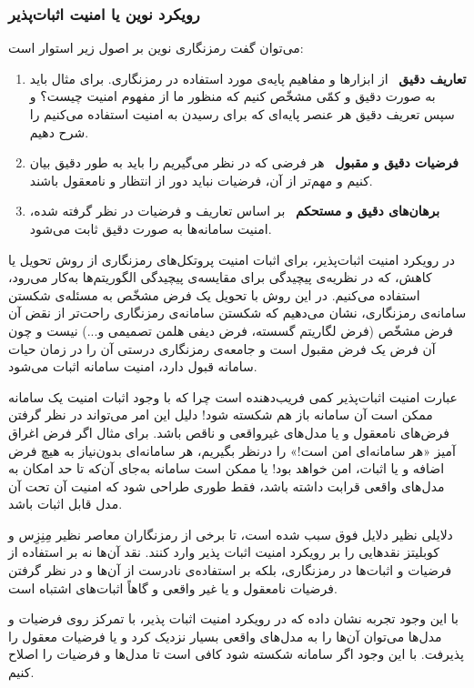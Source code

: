 \subsubsection*{رویکرد نوین یا امنیت اثبات‌پذیر}
می‌توان گفت رمزنگاری نوین بر اصول زیر استوار است:
\begin{enumerate}
	\item
	\textbf{تعاریف دقیق} 
	\ از ابزارها و مفاهیم پایه‌ی مورد استفاده در رمزنگاری. برای مثال باید به صورت دقیق و کمّی مشخّص کنیم که منظور ما از مفهوم امنیت چیست؟ و سپس تعریف دقیق هر عنصر پایه‌ای که برای رسیدن به امنیت استفاده می‌کنیم را شرح دهیم.
	\item
	\textbf{فرضیات دقیق و مقبول}
	\  هر فرضی که در نظر می‌گیریم را باید به طور دقیق بیان کنیم و مهم‌تر از آن،  فرضیات نباید دور از انتظار و نامعقول باشند. 
	 \item
	\textbf{ برهان‌های دقیق و مستحکم}
	\ بر اساس تعاریف و فرضیات در نظر گرفته شده، امنیت سامانه‌ها به صورت دقیق ثابت می‌شود. 
\end{enumerate}


در رویکرد امنیت اثبات‌پذیر، برای اثبات امنیت پروتکل‌های رمزنگاری از روش تحویل یا کاهش،
که در نظریه‌ی پیچیدگی  برای مقایسه‌ی پیچیدگی الگوریتم‌ها به‌کار می‌رود، استفاده می‌کنیم. در این روش با تحویل یک فرض مشخّص به مسئله‌ی شکستن سامانه‌ی رمزنگاری، نشان می‌دهیم که شکستن سامانه‌ی رمزنگاری راحت‌تر از نقض آن فرض مشخّص (فرض لگاریتم گسسته، فرض دیفی هلمن تصمیمی و...) نیست و چون آن فرض یک فرض مقبول است و جامعه‌ی رمزنگاری درستی آن را در زمان حیات سامانه قبول دارد، امنیت سامانه اثبات می‌شود.


عبارت 
امنیت اثبات‌پذیر 
کمی فریب‌دهنده است چرا که با وجود اثبات امنیت یک سامانه ممکن است آن سامانه باز هم شکسته شود! دلیل این امر می‌تواند در نظر گرفتن فرض‌های نامعقول و یا مدل‌های غیرواقعی و ناقص باشد. برای مثال اگر فرض اغراق آمیز 
«هر سامانه‌ای امن است!»
 را درنظر بگیریم، هر سامانه‌ای بدون‌نیاز به هیچ فرض اضافه و یا اثبات، امن خواهد بود! یا ممکن است سامانه به‌جای آن‌که تا حد امکان به مدل‌های واقعی قرابت داشته باشد، فقط طوری طراحی  شود که امنیت آن تحت آن مدل قابل اثبات باشد.
 
 
 دلایلی نظیر دلایل فوق سبب شده است، تا برخی از رمزنگاران معاصر
 نظیر مِنِزِس
 و
 کوبلیتز
 نقدهایی را بر رویکرد امنیت اثبات پذیر وارد کنند.
   نقد آن‌ها نه بر استفاده از فرضیات و اثبات‌ها در رمزنگاری، بلکه بر استفاده‌ی نادرست از آن‌ها و در نظر گرفتن فرضیات نامعقول و یا غیر واقعی و گاهاً اثبات‌های اشتباه است. 
   
   با این وجود تجربه نشان داده که در رویکرد امنیت اثبات پذیر، با تمرکز روی فرضیات و مدل‌ها می‌توان آن‌ها را به مدل‌های واقعی بسیار نزدیک کرد و یا فرضیات معقول را پذیرفت. با این وجود اگر سامانه شکسته شود کافی است تا مدل‌ها و فرضیات را اصلاح کنیم.




